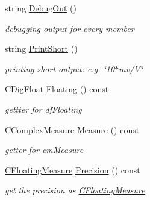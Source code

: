 \begin{DoxyCompactItemize}
string \hyperlink{classCFloatingMeasure_a6d92f39204f23e81732cb77131517b6f}{Debug\+Out} ()
\begin{DoxyCompactList}\small\item\em debugging output for every member \end{DoxyCompactList}\item 
string \hyperlink{classCFloatingMeasure_af4caaa697967a257bc6e13117843ff58}{Print\+Short} ()
\begin{DoxyCompactList}\small\item\em printing short output\+: e.\+g. \char`\"{}10$\ast$mv/\+V\char`\"{} \end{DoxyCompactList}\item 
\hyperlink{classCDigFloat}{C\+Dig\+Float} \hyperlink{classCFloatingMeasure_ab41354d28783d125159bd6e9372c6d9f}{Floating} () const
\begin{DoxyCompactList}\small\item\em gettter for df\+Floating \end{DoxyCompactList}\item 
\hyperlink{classCComplexMeasure}{C\+Complex\+Measure} \hyperlink{classCFloatingMeasure_a8ac3af95a2619670a51d744c85b44463}{Measure} () const
\begin{DoxyCompactList}\small\item\em getter for cm\+Measure \end{DoxyCompactList}\item 
\hyperlink{classCFloatingMeasure}{C\+Floating\+Measure} \hyperlink{classCFloatingMeasure_ac8975daf37b98b3e996893e0de43c4eb}{Precision} () const
\begin{DoxyCompactList}\small\item\em get the precision as \hyperlink{classCFloatingMeasure}{C\+Floating\+Measure} \end{DoxyCompactList}\end{DoxyCompactItemize}
